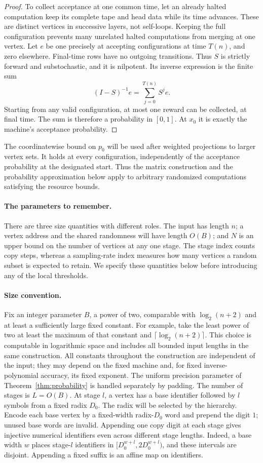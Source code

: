 \begin{proof}
To collect acceptance at one common time, let an already halted computation keep its complete tape and head data while its time advances. These are distinct vertices in successive layers, not self-loops. Keeping the full configuration prevents many unrelated halted computations from merging at one vertex. Let $e$ be one precisely at accepting
configurations at time $T(n)$, and zero elsewhere. Final-time rows
have no outgoing transitions. Thus $S$ is strictly forward and
substochastic, and it is nilpotent. Its inverse expression is the finite
sum
\[
(I-S)^{-1}e=\sum_{j=0}^{T(n)}S^je.
\]
Starting from any valid configuration, at most one reward can be
collected, at final time. The sum is therefore a probability in
$[0,1]$. At $x_0$ it is exactly the machine's acceptance probability.
\end{proof}

The coordinatewise bound on $p_0$ will be used after weighted projections
to larger vertex sets.  It holds at every configuration, independently
of the acceptance probability at the designated start.  Thus the matrix
construction and the probability approximation below apply to arbitrary
randomized computations satisfying the resource bounds.

\paragraph{The parameters to remember.}
There are three size quantities with different roles. The input has length $n$; a vertex address and the shared randomness will have length $O(B)$; and $N$ is an upper bound on the number of vertices at any one stage. The stage index counts copy steps, whereas a sampling-rate index measures how many vertices a random subset is expected to retain. We specify these quantities below before introducing any of the local thresholds.

\paragraph{Size convention.}
Fix an integer parameter $B$, a power of two, comparable with
$\log_2(n+2)$ and at least a sufficiently large fixed constant.
For example, take the least power of two at least the maximum of that
constant and $\lceil\log_2(n+2)\rceil$.  This choice is computable in
logarithmic space and includes all bounded input lengths in the same
construction. All constants throughout the
construction are independent of the input; they may depend on the fixed
machine and, for fixed inverse-polynomial accuracy, its fixed exponent.
The uniform precision parameter of Theorem~\ref{thm:probability} is
handled separately by padding. The number of stages is $L=O(B)$. At stage $l$, a vertex has
a base identifier followed by $l$ symbols from a fixed radix $D_0$.
The radix will be selected by the hierarchy. Encode each base vertex by
a fixed-width radix-$D_0$ word and prepend the digit $1$; unused base
words are invalid. Appending one copy digit at each stage gives
injective numerical identifiers even across different stage lengths.
Indeed, a base width $w$ places stage-$l$ identifiers in
$[D_0^{w+l},2D_0^{w+l})$, and these intervals are disjoint.
Appending a fixed suffix is an affine map on identifiers.

